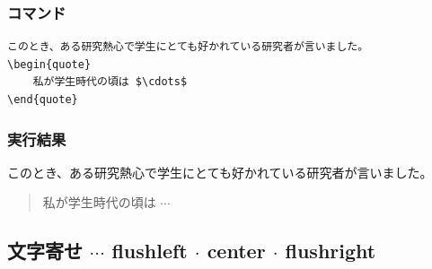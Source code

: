 \documentclass[a4j, titlepage]{jarticle}
\begin{document}
\begin{multicols}{2}
\subsubsection*{コマンド}
\begin{lstlisting}
このとき、ある研究熱心で学生にとても好かれている研究者が言いました。
\begin{quote}
    私が学生時代の頃は $\cdots$
\end{quote}
\end{lstlisting}

\vfill\null
\columnbreak


\subsubsection*{実行結果}
\begin{screen}

    このとき、ある研究熱心で学生にとても好かれている研究者が言いました。
    \begin{quote}
        私が学生時代の頃は $\cdots$
    \end{quote}

\end{screen}
\end{multicols}

\subsection{文字寄せ $\cdots$ flushleft $\cdot$ center $\cdot$ flushright}
\end{document}
